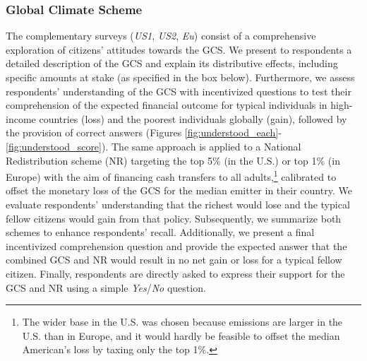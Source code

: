 
\subsubsection{Global Climate Scheme}\label{subsubsec:support_gcs}

The complementary surveys (\textit{US1}, \textit{US2}, \textit{Eu}) consist of a comprehensive exploration of citizens' attitudes towards the GCS. We present to respondents a detailed description of the GCS and explain its distributive effects, including specific amounts at stake (as specified in the box below). Furthermore, we assess respondents' understanding of the GCS with incentivized questions to test their comprehension of the expected financial outcome for typical individuals in high-income countries (loss) and the poorest individuals globally (gain), followed by the provision of correct answers (Figures \ref{fig:understood_each}-\ref{fig:understood_score}). %
The same approach is applied to a National Redistribution scheme (NR) targeting the top 5\% (in the U.S.) or top 1\% (in Europe) with the aim of financing cash transfers to all adults,\footnote{The wider base in the U.S. was chosen because emissions are larger in the U.S. than in Europe, and it would hardly be feasible to offset the median American's loss by taxing only the top 1\%.} calibrated to offset the monetary loss of the GCS for the median emitter in their country. We evaluate respondents' understanding that the richest would lose and the typical fellow citizens would gain from that policy. %
Subsequently, we summarize both schemes to enhance respondents' recall. Additionally, we present a final incentivized comprehension question and provide the expected answer that the combined GCS and NR would result in no net gain or loss for a typical fellow citizen. Finally, respondents are directly asked to express their support for the GCS and NR using a simple \textit{Yes}/\textit{No} question.



